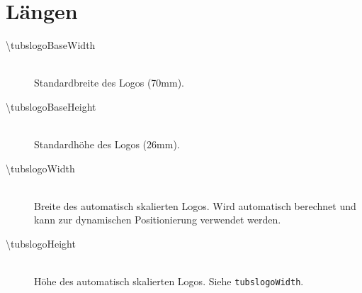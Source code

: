 \documentclass{scrartcl}
\begin{document}
\section{Längen}
  \begin{description}
    \item[\mdseries\ttfamily \textbackslash tubslogoBaseWidth]\hfill\\
      Standardbreite des Logos (70mm).
    \item[\mdseries\ttfamily \textbackslash tubslogoBaseHeight]\hfill\\
      Standardhöhe des Logos (26mm).
    \item[\mdseries\ttfamily \textbackslash tubslogoWidth]\hfill\\
      Breite des automatisch skalierten Logos. Wird automatisch berechnet und
      kann zur dynamischen Positionierung verwendet werden.
    \item[\mdseries\ttfamily \textbackslash tubslogoHeight]\hfill\\
      Höhe des automatisch skalierten Logos. Siehe \lstinline{tubslogoWidth}.
  \end{description}
\end{document}

